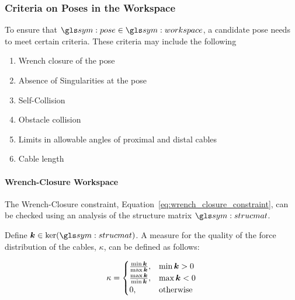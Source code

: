 		\subsubsection{Criteria on Poses in the Workspace}%
		\label{sec:criteria_on_poses_in_the_workspace}

			To ensure that $\pose\in\workspace$, a	candidate  pose  needs	to
			meet certain criteria.  These criteria may  include	the
			following

			\begin{enumerate}

				\item Wrench closure of the pose

				\item Absence of Singularities at the pose

				\item Self-Collision

				\item Obstacle collision

				\item Limits in allowable  angles  of  proximal  and  distal
					cables

				\item Cable length


			\end{enumerate}

			\paragraph{Wrench-Closure Workspace}%
			\label{sec:wrench_closure_workspace}

				The Wrench-Closure constraint,
				Equation~\ref{eq:wrench_closure_constraint}, can be checked
				using an analysis of the structure matrix $\strucmat$.


				Define $\vec{k} \in \ker(\strucmat)$.  A measure for the quality
				of the force distribution of the cables, $\kappa$, can  be
				defined  as follows:

				\begin{equation}
					\kappa  =
						\begin{cases}
							\frac
							{%
								\min{\vec{k}}
							}
							{%
								\max{\vec{k}}
							},
							& \min{\vec{k}} > 0
							\\
							\frac
							{%
								\max{\vec{k}}
							}
							{%
								\min{\vec{k}}
							},
							& \max{\vec{k}} < 0
							\\
							0, & \text{otherwise}
						\end{cases}
				\end{equation}

